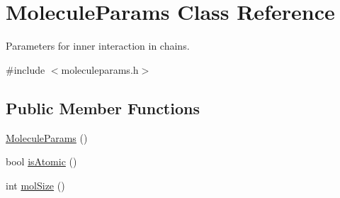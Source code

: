 \hypertarget{class_molecule_params}{\section{Molecule\+Params Class Reference}
\label{class_molecule_params}
}


Parameters for inner interaction in chains.  




{\ttfamily \#include $<$moleculeparams.\+h$>$}

\subsection*{Public Member Functions}
\begin{DoxyCompactItemize}
\item 
\hyperlink{class_molecule_params_a33689bb37655eed3447e989be5149cf3}{Molecule\+Params} ()
\item 
bool \hyperlink{class_molecule_params_a4144cbf276e3e7e25c7a6f3557e4f80b}{is\+Atomic} ()
\item 
int \hyperlink{class_molecule_params_a025ace7f9070a6b19b7b536e1d7f565f}{mol\+Size} ()
\end{DoxyCompactItemize}
